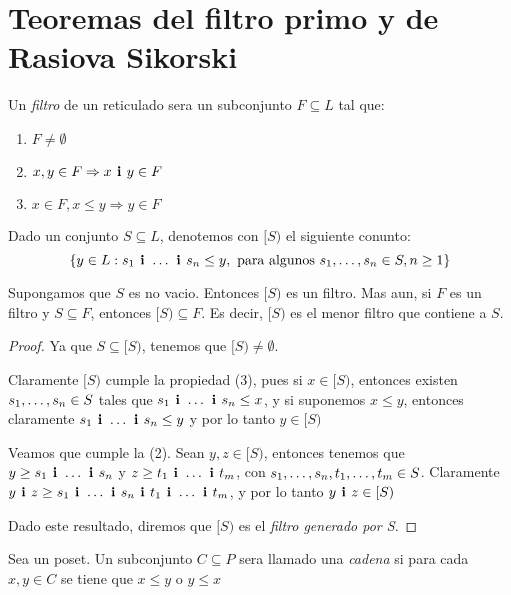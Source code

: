 \section{Teoremas del filtro primo y de Rasiova Sikorski}
\begin{definition}
  Un \emph{filtro} de un reticulado \reticulAlg sera un subconjunto $F \subseteq L$ tal que:
  \begin{enumerate}
    \item $F \neq \emptyset$
    \item $x, y \in F \Rightarrow \infbin{x}{y} \in F$
    \item $x \in F, x \leq y \Rightarrow y \in F$
  \end{enumerate}
\end{definition}

\begin{definition}
  Dado un conjunto $S \subseteq L$, denotemos con $[S)$ el siguiente conunto:
  $$
  \{y \in L : \succession[\textbf{ i }]{s}{1}{n} \leq y, \text{ para algunos } \succession{s}{1}{n} \in S, n \geq 1\}
  $$
\end{definition}
\begin{lemma}
  Supongamos que $S$ es no vacio. Entonces $[S)$ es un filtro. Mas aun, si $F$ es un filtro y $S \subseteq F$, entonces
  $[S) \subseteq F$. Es decir, $[S)$ es el menor filtro que contiene a $S$.
\end{lemma}
\begin{proof}
  Ya que $S \subseteq [S)$, tenemos que $[S) \neq \emptyset$.
  
  Claramente $[S)$ cumple la propiedad (3), pues si $x \in [S)$, entonces existen $\succession{s}{1}{n}\in S$ tales que $\succession[\textbf{ i }]{s}{1}{n} \leq x$, y si suponemos $x \leq y$,
  entonces claramente $\succession[\textbf{ i }]{s}{1}{n}\leq y$ y por lo tanto $y\in [S)$

  Veamos que cumple la (2). Sean $y, z \in [S)$, entonces tenemos que $y \geq \succession[\textbf{ i }]{s}{1}{n}$ y
  $z \geq \succession[\textbf{ i }]{t}{1}{m}$, con $\succession{s}{1}{n}, \succession{t}{1}{m} \in S$. Claramente $\infbin{y}{z} \geq \infbin{\succession[\textbf{ i }]{s}{1}{n}}{\succession[\textbf{ i }]{t}{1}{m}}$,
  y por lo tanto $\infbin{y}{z}\in [S)$

  Dado este resultado, diremos que $[S)$ es el \emph{filtro generado por S}.
\end{proof}

\begin{definition}
  Sea \poset un poset. Un subconjunto $C \subseteq P$ sera llamado una \emph{cadena} si para cada
  $x, y \in C$ se tiene que $x \leq y$ o $y \leq x$
\end{definition}

